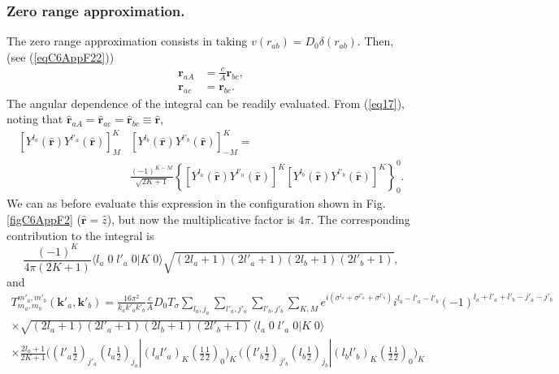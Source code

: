 \begin{subappendices}
\subsubsection{Zero range approximation.}
The zero range approximation consists in taking $v(r_{ab})=D_0\delta(r_{ab})$. Then, (see (\ref{eqC6AppF22}))
\begin{equation}\label{eqC6AppG52}
\begin{split}
\mathbf{r}_{aA}&=\frac{c}{A}\mathbf{r}_{bc},\\
\mathbf{r}_{ac}&=\mathbf{r}_{bc}.
\end{split} 
\end{equation}
The angular dependence of the integral can be readily evaluated. From (\ref{eq17}), noting that $\hat{\mathbf r}_{aA}=\hat{\mathbf r}_{ac}=\hat{\mathbf r}_{bc}\equiv \hat{\mathbf r}$,
\begin{equation}\label{eqC6AppG53}
\begin{split}
\left[ Y^{l_a} (\hat{\mathbf r}) Y^{l'_a} (\hat{ \mathbf r})\right]^K_M &   \left[ Y^{l_b} (\hat{\mathbf r}) Y^{l'_b} (\hat{\mathbf r})\right]^{K}_{-M}=\\
&\frac{(-1)^{K-M}}{\sqrt{2K+1}}\left\{\left[ Y^{l_a} (\hat{\mathbf r}) Y^{l'_a} (\hat{ \mathbf r})\right]^K\left[ Y^{l_b} (\hat{\mathbf r}) Y^{l'_b} (\hat{\mathbf r})\right]^{K} \right\}^0_0.
\end{split}
\end{equation}
We can as before evaluate this expression in the configuration shown in Fig. \ref{figC6AppF2} ($\hat{\mathbf r}=\hat z$), but now the multiplicative factor is $4\pi$. The corresponding contribution to the integral is
\begin{equation}\label{eqC6AppG54}
\frac{(-1)^K}{4\pi(2K+1)}\langle l_a\;0\;l'_a\;0|K\;0\rangle\sqrt{(2l_a+1)(2l'_a+1)(2l_b+1)(2l'_b+1)},
\end{equation}
and
\begin{multline}\label{eqC6AppG55}
T_{m_a,m_b}^{m'_a,m'_b}(\mathbf{k}'_a,\mathbf{k}'_b)=\frac{16\pi^{2}}{k_ak'_ak'_b}\frac{c}{A}D_0T_\sigma\sum_{l_a,j_a}\sum_{l'_a,j'_a}\sum_{l'_b,j'_b}\sum_{K,M}
 e^{i(\sigma^{l_a}+\sigma^{l'_a}+\sigma^{l'_b})}i^{l_a-l'_a-l'_b}(-1)^{l_a+l'_a+l'_b-j'_a-j'_b}\\
 \times\sqrt{(2l_a+1)(2l'_a+1)(2l_b+1)(2l'_b+1)}\,\langle l_a\;0\;l'_a\;0|K\;0\rangle\\
 \times \frac{2l_a+1}{2K+1}\bigl((l'_a \tfrac{1}{2})_{j'_a}(l_a \tfrac{1}{2})_{j_a}|(l_a l'_a)_K(\tfrac{1}{2} \tfrac{1}{2})_0\bigr)_K\,\bigl((l'_b \tfrac{1}{2})_{j'_b}(l_b \tfrac{1}{2})_{j_b}|(l_b l'_b)_{K}(\tfrac{1}{2} \tfrac{1}{2})_0\bigr)_{K}\\

\end{multline}
\end{subappendices}
